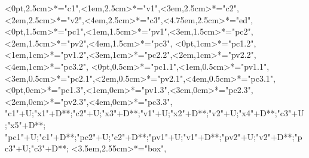 \begin{multicols}{3}
\begin{exe}
{\begin{xlist}
{			<0pt,2.5cm>*="c1",<1em,2.5cm>*="v1",<3em,2.5cm>*="c2",<2em,2.5cm>*="v2",<4em,2.5cm>*="c3",<4.75em,2.5cm>*\as{\#}="ed",	
			<0pt,1.5cm>*="pc1",<1em,1.5cm>*="pv1",<3em,1.5cm>*="pc2",<2em,1.5cm>*="pv2",<4em,1.5cm>*="pc3",
			<0pt,1cm>*="pc1.2",<1em,1cm>*="pv1.2",<3em,1cm>*\as{ }="pc2.2",<2em,1cm>*="pv2.2",<4em,1cm>*="pc3.2",
			<0pt,0.5cm>*="pc1.1",<1em,0.5cm>*="pv1.1",<3em,0.5cm>*="pc2.1",<2em,0.5cm>*="pv2.1",<4em,0.5cm>*\as{ }="pc3.1",
			<0pt,0cm>*\as{[ʔ]}="pc1.3",<1em,0cm>*="pv1.3",<3em,0cm>*\as{ }="pc2.3",<2em,0cm>*="pv2.3",<4em,0cm>*\as{ }="pc3.3",
			"c1"+U;"x1"+D**\dir{-};"c2"+U;"x3"+D**\dir{-};"v1"+U;"x2"+D**\dir{-};"v2"+U;"x4"+D**\dir{-};"c3"+U;"x5"+D**\dir{-};
			"pc1"+U;"c1"+D**\dir{-};"pc2"+U;"c2"+D**\dir{-};"pv1"+U;"v1"+D**\dir{-};"pv2"+U;"v2"+D**\dir{-};"pc3"+U;"c3"+D**\dir{-};
			<3.5em,2.55cm>*="box",
		\endxy}\label{as:muiq3}
	\end{xlist}}\label{as:muiq}
\end{exe}
\end{multicols}
